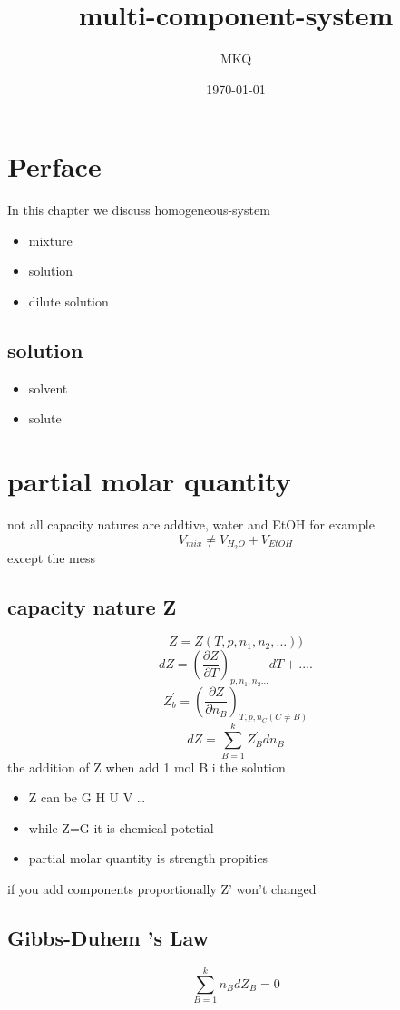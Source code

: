 \documentclass[11pt]{article}
\author{MKQ}
\date{\today}
\title{multi-component-system}
\begin{document}
\maketitle
\tableofcontents

\section{Perface}
\label{sec:orgbfe8429}
In this chapter we discuss homogeneous-system
\begin{itemize}
\item mixture
\item solution
\item dilute solution
\end{itemize}
\subsection{solution}
\label{sec:org4f2ceec}
\begin{itemize}
\item solvent
\item solute
\end{itemize}
\section{partial molar quantity}
\label{sec:org7cf869d}
not all capacity natures are addtive, water and EtOH for example
\[
V_{mix}\neq V_{H_{2}O}+V_{EtOH}
\]
except the mess
\subsection{capacity nature Z}
\label{sec:org5615782}
\[
Z=Z(T,p,n_1,n_2,...))
\]
\[
dZ=(\frac{\partial Z}{\partial T})_{p,n_1,n_2...}dT+....
\]
\[
Z_b^' =(\frac{\partial Z}{\partial n_B})_{T,p,n_C (C\neq B)}
\]
\[
dZ=\sum^{k}_{B=1}Z_B^' dn_B
\]
the addition of Z when add 1 mol B i the solution
\begin{itemize}
\item Z can be G H U V \ldots{}
\item while Z=G it is chemical potetial
\item partial molar quantity is strength propities
\end{itemize}

if you add components proportionally Z' won't changed
\subsection{Gibbs-Duhem 's Law}
\label{sec:orgd5c2182}
\[
\sum_{B=1}^{k}n_B dZ_B =0
\]
\end{document}

